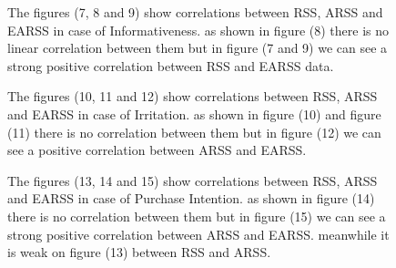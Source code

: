 \documentclass[letterpaper, 10 pt, conference]{ieeeconf}
\begin{document}
\begin{figure}[h!]
\hfill
\end{figure}

\begin{figure}[h!]
The figures (7, 8 and 9) show correlations between RSS, ARSS and EARSS in case of Informativeness. as shown in figure (8) there is no linear correlation between them but in figure (7 and 9) we can see a strong positive correlation between RSS and EARSS data. 
\end{figure}
\begin{figure}[h!]
The figures (10, 11 and 12) show correlations between RSS, ARSS and EARSS in case of Irritation. as shown in figure (10) and figure (11) there is no correlation between them but in figure (12) we can see a positive correlation between ARSS and EARSS. 
\end{figure}
\begin{figure}[h!]
The figures (13, 14 and 15) show correlations between RSS, ARSS and EARSS in case of Purchase Intention. as shown in figure (14) there is no correlation between them but in figure (15) we can see a strong positive correlation between ARSS and EARSS. meanwhile it is weak on figure (13) between  RSS and ARSS.
\end{figure}
\end{document}
